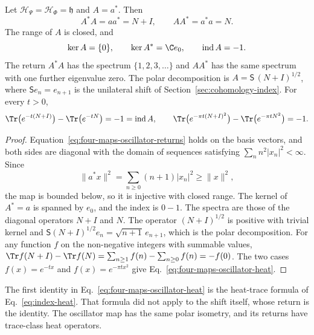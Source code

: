 \begin{proposition}
\label{prop:four-maps-oscillator}
Let $\mathcal H_\Psi=\mathcal H_\Phi=\mathfrak h$ and $A=a^*$. Then
\begin{equation}
 A^*A=aa^*=N+I,\qquad AA^*=a^*a=N .
 \label{eq:four-maps-oscillator-returns}
\end{equation}
The range of $A$ is closed, and
\begin{equation}
 \ker A=\{0\},\qquad\ker A^*=\C e_0,\qquad\operatorname{ind}A=-1 .
 \label{eq:four-maps-oscillator-index}
\end{equation}
The return $A^*A$ has the spectrum $\{1,2,3,\dots\}$ and $AA^*$ has the same spectrum with one further eigenvalue zero. The polar decomposition is $A=\mathsf S\,(N+I)^{1/2}$, where $\mathsf S e_n=e_{n+1}$ is the unilateral shift of Section~\ref{sec:cohomology-index}. For every $t>0$,
\begin{equation}
 \Tr\bigl(e^{-t(N+I)}\bigr)-\Tr\bigl(e^{-tN}\bigr)=-1=\operatorname{ind}A ,\qquad
 \Tr\bigl(e^{-\pi t(N+I)^2}\bigr)-\Tr\bigl(e^{-\pi tN^2}\bigr)=-1 .
 \label{eq:four-maps-oscillator-heat}
\end{equation}
\end{proposition}
\begin{proof}
Equation~\eqref{eq:four-maps-oscillator-returns} holds on the basis vectors, and both sides are diagonal with the domain of sequences satisfying $\sum_nn^2|x_n|^2<\infty$. Since
\[
 \|a^*x\|^2=\sum_{n\ge0}(n+1)|x_n|^2\ge\|x\|^2 ,
\]
the map is bounded below, so it is injective with closed range. The kernel of $A^*=a$ is spanned by $e_0$, and the index is $0-1$. The spectra are those of the diagonal operators $N+I$ and $N$. The operator $(N+I)^{1/2}$ is positive with trivial kernel and $\mathsf S(N+I)^{1/2}e_n=\sqrt{n+1}\,e_{n+1}$, which is the polar decomposition. For any function $f$ on the non-negative integers with summable values, $\Tr f(N+I)-\Tr f(N)=\sum_{n\ge1}f(n)-\sum_{n\ge0}f(n)=-f(0)$. The two cases $f(x)=e^{-tx}$ and $f(x)=e^{-\pi tx^2}$ give Eq.~\eqref{eq:four-maps-oscillator-heat}.
\end{proof}

The first identity in Eq.~\eqref{eq:four-maps-oscillator-heat} is the heat-trace formula of Eq.~\eqref{eq:index-heat}. That formula did not apply to the shift itself, whose return is the identity. The oscillator map has the same polar isometry, and its returns have trace-class heat operators.

